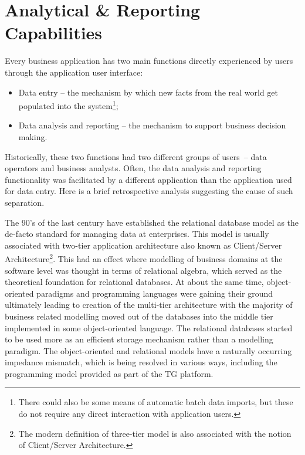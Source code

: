 \section{Analytical \& Reporting Capabilities}\label{sec:06}
  Every business application has two main functions directly experienced by users through the application user interface:
  \begin{itemize}
   \item Data entry -- the mechanism by which new facts from the real world get populated into the system\footnote{There could also be some means of automatic batch data imports, but these do not require any direct interaction with application users.};
   \item Data analysis and reporting -- the mechanism to support business decision making.
  \end{itemize}
  Historically, these two functions had two different groups of users~-- data operators and business analysts.
  Often, the data analysis and reporting functionality was facilitated by a different application than the application used for data entry.
  Here is a brief retrospective analysis suggesting the cause of such separation.
  
  The 90's of the last century have established the relational database model as the de-facto standard for managing data at enterprises.
  This model is usually associated with two-tier application architecture also known as Client/Server Architecture\footnote{The modern definition of three-tier model is also associated with the notion of Client/Server Architecture.}.
  This had an effect where modelling of business domains at the software level was thought in terms of relational algebra, which served as the theoretical foundation for relational databases.
  At about the same time, object-oriented paradigms and programming languages were gaining their ground ultimately leading to creation of the multi-tier architecture with the majority of business related modelling moved out of the databases into the middle tier implemented in some object-oriented language.
  The relational databases started to be used more as an efficient storage mechanism rather than a modelling paradigm.
  The object-oriented and relational models have a naturally occurring impedance mismatch, which is being resolved in various ways, including the programming model provided as part of the TG platform.
  
